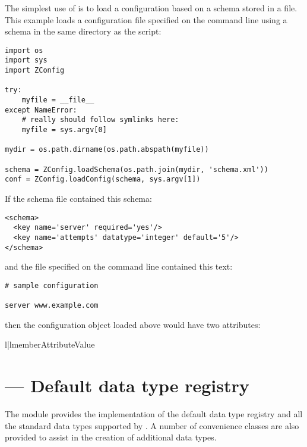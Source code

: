 \documentclass{howto}
\begin{document}
The simplest use of  is to load a configuration
based on a schema stored in a file.  This example loads a
configuration file specified on the command line using a schema in the
same directory as the script:

\begin{verbatim}
import os
import sys
import ZConfig

try:
    myfile = __file__
except NameError:
    # really should follow symlinks here:
    myfile = sys.argv[0]

mydir = os.path.dirname(os.path.abspath(myfile))

schema = ZConfig.loadSchema(os.path.join(mydir, 'schema.xml'))
conf = ZConfig.loadConfig(schema, sys.argv[1])
\end{verbatim}

If the schema file contained this schema:

\begin{verbatim}
<schema>
  <key name='server' required='yes'/>
  <key name='attempts' datatype='integer' default='5'/>
</schema>
\end{verbatim}

and the file specified on the command line contained this text:

\begin{verbatim}
# sample configuration

server www.example.com
\end{verbatim}

then the configuration object  loaded above would have two
attributes:

\begin{tableii}{l|l}{member}{Attribute}{Value}
\end{tableii}


\section{ --- Default data type registry}


The  module provides the implementation of
the default data type registry and all the standard data types
supported by .  A number of convenience classes are
also provided to assist in the creation of additional data types.
\end{document}
